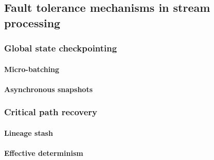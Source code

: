 \subsection{Fault tolerance mechanisms in stream processing}

\subsubsection{Global state checkpointing}

\paragraph{Micro-batching}
\cite{Zaharia:2012:DSE:2342763.2342773}

\paragraph{Asynchronous snapshots}
\cite{Carbone:2017:SMA:3137765.3137777}

\subsubsection{Critical path recovery}

\paragraph{Lineage stash}
\cite{Wang:2019:LSF:3341301.3359653}

\paragraph{Effective determinism}
\cite{Akidau:2013:MFS:2536222.2536229, silvestre2021clonos}
